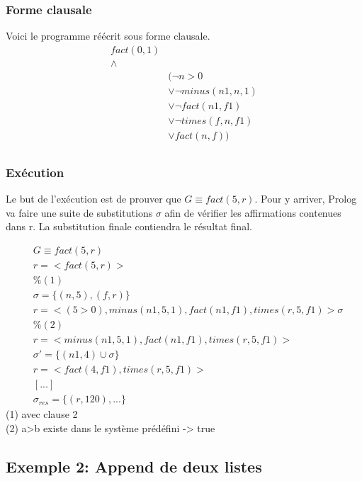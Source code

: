 \subsubsection{Forme clausale}
Voici le programme réécrit sous forme clausale. 
\begin{align*}
fact(0,1) \\
 \wedge & \\
&( \neg n > 0 \\
&	\vee \neg minus( n1, n, 1) \\
&	\vee \neg fact(n1, f1) \\
&	\vee \neg times(f, n, f1) \\
&	\vee fact(n, f) ) \\
\end{align*}

\subsubsection{Exécution} 
Le but de l'exécution est de prouver que $G \equiv fact(5, r)$. Pour y arriver, Prolog va faire une suite de substitutions $\sigma$ afin de vérifier les affirmations contenues dans r. La substitution finale contiendra le résultat final.

\begin{align*}
& G \equiv fact(5,r) \\
& r= < fact(5, r) > \\
& \% (1) \\
& \sigma = \{ (n, 5), (f, r) \} \\
& r= < ( 5>0 ), minus(n1, 5, 1), fact(n1, f1), times(r, 5, f1) > \sigma \\
& \% (2) \\
& r= < minus(n1, 5, 1), fact(n1, f1), times(r, 5, f1) > \\
& \sigma'= \{ (n1, 4) \cup \sigma\} \\
& r= < fact(4, f1), times(r, 5, f1) > \\
& [...]\\
& \sigma_{res} = \{(r,120),...\} 
\end{align*}
(1) avec clause 2\\
(2) a>b existe dans le système prédéfini -> true\\

\subsection{Exemple 2: Append de deux listes}

